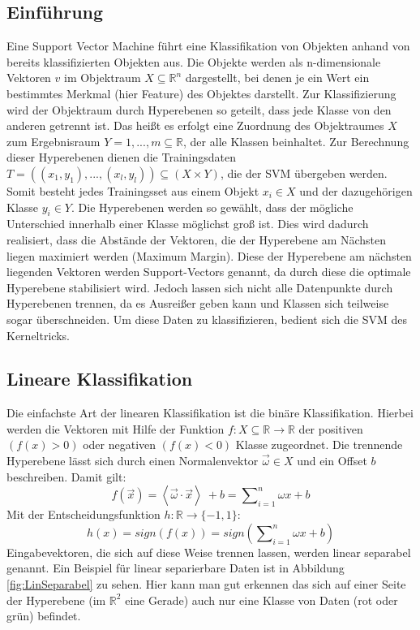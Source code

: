 \subsection{Einführung}
\label{subsec:einfuehrung}
Eine Support Vector Machine führt eine Klassifikation von Objekten anhand von bereits klassifizierten Objekten aus. Die Objekte werden als n-dimensionale Vektoren $v$ im Objektraum $X \subseteq \mathbb{R}^{n} $ dargestellt, bei denen je ein Wert ein bestimmtes Merkmal (hier Feature) des Objektes darstellt. Zur Klassifizierung wird der Objektraum durch Hyperebenen so geteilt, dass jede Klasse von den anderen getrennt ist. Das heißt es erfolgt eine Zuordnung des Objektraumes $X$ zum Ergebnisraum $Y = {1,...,m} \subseteq \mathbb{R}$, der alle Klassen beinhaltet. Zur Berechnung dieser Hyperebenen dienen die Trainingsdaten $T =((x_{1},y_{1}),...,(x_{l},y_{l})) \subseteq (X \times Y)$, die der SVM übergeben werden. Somit besteht jedes Trainingsset aus einem Objekt $x_{i} \in X$ und der dazugehörigen Klasse $y_{i} \in Y$. Die Hyperebenen werden so gewählt, dass der mögliche Unterschied innerhalb einer Klasse möglichst groß ist. Dies wird dadurch realisiert, dass die Abstände der Vektoren, die der Hyperebene am Nächsten liegen maximiert werden (Maximum Margin). Diese der Hyperebene am nächsten liegenden Vektoren werden Support-Vectors genannt, da durch diese die optimale Hyperebene \glqq{}stabilisiert\grqq{} wird. Jedoch lassen sich nicht alle Datenpunkte durch Hyperebenen trennen, da es Ausreißer geben kann und Klassen sich teilweise sogar überschneiden. Um diese Daten zu klassifizieren, bedient sich die SVM des Kerneltricks. \cite{laechele-svm}

\subsection{Lineare Klassifikation}
\label{subsec:lineare-klassifikation}
Die einfachste Art der linearen Klassifikation ist die binäre Klassifikation. Hierbei werden die Vektoren mit Hilfe der Funktion $ f: X \subseteq \mathbb{R} \rightarrow \mathbb{R} $ der positiven $ (f(x)>0) $ oder negativen $ (f(x)<0) $ Klasse zugeordnet. Die trennende Hyperebene lässt sich durch einen Normalenvektor $\vec{\omega} \in X$ und ein Offset $b$ beschreiben.
Damit gilt:\[ f(\vec{x})=\left\langle \vec{\omega} \cdot \vec{x} \right\rangle\ + b = \sum\nolimits_{i=1}^n \omega x + b \]
Mit der Entscheidungsfunktion $h : \mathbb{R} \rightarrow \{-1,1\}$:
\[ h(x) = sign(f(x)) = sign (\sum\nolimits_{i=1}^n \omega x + b)\]
Eingabevektoren, die sich auf diese Weise trennen lassen, werden linear separabel genannt. Ein Beispiel für linear separierbare Daten ist in Abbildung \ref{fig:LinSeparabel} zu sehen. Hier kann man gut erkennen das sich auf einer Seite der Hyperebene (im $\mathbb{R}^2$ eine Gerade) auch nur eine Klasse von Daten (rot oder grün) befindet.

